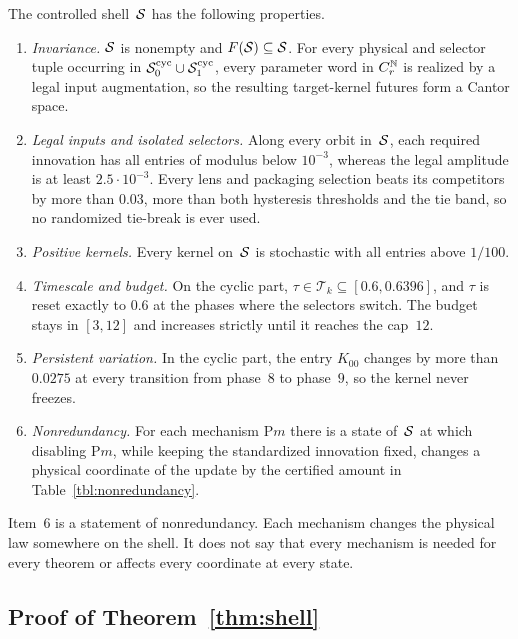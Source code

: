 \begin{theorem}\label{thm:shell}
The controlled shell~$\mathcal{S}$ has the following properties.
\begin{enumerate}
  \item \emph{Invariance.} $\mathcal{S}$ is nonempty and $F(\mathcal{S})\subseteq\mathcal{S}$. For every physical and selector tuple occurring in $\mathcal{S}_0^{\mathrm{cyc}}\cup\mathcal{S}_1^{\mathrm{cyc}}$, every parameter word in $C_r^{\mathbb{N}}$ is realized by a legal input augmentation, so the resulting target-kernel futures form a Cantor space.
  \item \emph{Legal inputs and isolated selectors.} Along every orbit in~$\mathcal{S}$, each required innovation has all entries of modulus below $10^{-3}$, whereas the legal amplitude is at least $2.5\cdot10^{-3}$. Every lens and packaging selection beats its competitors by more than $0.03$, more than both hysteresis thresholds and the tie band, so no randomized tie-break is ever used.
  \item \emph{Positive kernels.} Every kernel on~$\mathcal{S}$ is stochastic with all entries above $1/100$.
  \item \emph{Timescale and budget.} On the cyclic part, $\tau\in\mathcal{T}_k\subseteq[0.6,0.6396]$, and $\tau$ is reset exactly to $0.6$ at the phases where the selectors switch. The budget stays in $[3,12]$ and increases strictly until it reaches the cap~$12$.
  \item \emph{Persistent variation.} In the cyclic part, the entry $K_{00}$ changes by more than $0.0275$ at every transition from phase~$8$ to phase~$9$, so the kernel never freezes.
  \item \emph{Nonredundancy.} For each mechanism P$m$ there is a state of~$\mathcal{S}$ at which disabling P$m$, while keeping the standardized innovation fixed, changes a physical coordinate of the update by the certified amount in Table~\ref{tbl:nonredundancy}.
\end{enumerate}
\end{theorem}

Item~6 is a statement of nonredundancy. Each mechanism changes the physical law somewhere on the shell. It does not say that every mechanism is needed for every theorem or affects every coordinate at every state.

\subsection{Proof of Theorem~\ref{thm:shell}}

